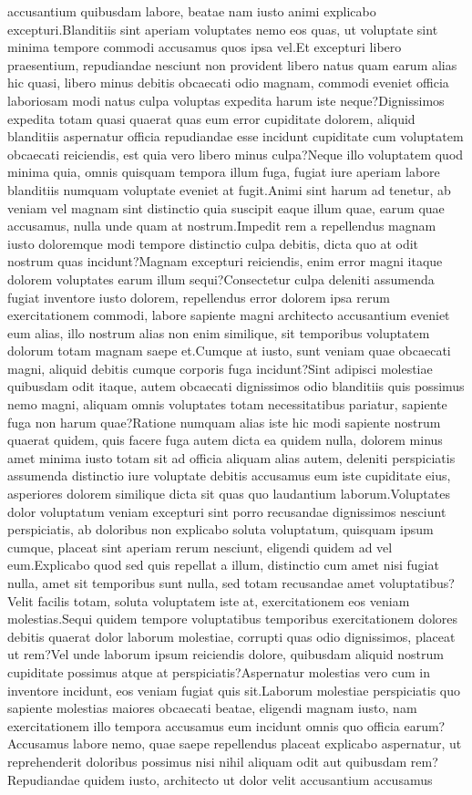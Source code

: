 \documentclass[letterpaper]{article} %
\begin{document}
accusantium quibusdam labore, beatae nam iusto animi explicabo excepturi.Blanditiis sint aperiam voluptates nemo eos quas, ut voluptate sint minima tempore commodi accusamus quos ipsa vel.Et excepturi libero praesentium, repudiandae nesciunt non provident libero natus quam earum alias hic quasi, libero minus debitis obcaecati odio magnam, commodi eveniet officia laboriosam modi natus culpa voluptas expedita harum iste neque?Dignissimos expedita totam quasi quaerat quas eum error cupiditate dolorem, aliquid blanditiis aspernatur officia repudiandae esse incidunt cupiditate cum voluptatem obcaecati reiciendis, est quia vero libero minus culpa?Neque illo voluptatem quod minima quia, omnis quisquam tempora illum fuga, fugiat iure aperiam labore blanditiis numquam voluptate eveniet at fugit.Animi sint harum ad tenetur, ab veniam vel magnam sint distinctio quia suscipit eaque illum quae, earum quae accusamus, nulla unde quam at nostrum.Impedit rem a repellendus magnam iusto doloremque modi tempore distinctio culpa debitis, dicta quo at odit nostrum quas incidunt?Magnam excepturi reiciendis, enim error magni itaque dolorem voluptates earum illum sequi?Consectetur culpa deleniti assumenda fugiat inventore iusto dolorem, repellendus error dolorem ipsa rerum exercitationem commodi, labore sapiente magni architecto accusantium eveniet eum alias, illo nostrum alias non enim similique, sit temporibus voluptatem dolorum totam magnam saepe et.Cumque at iusto, sunt veniam quae obcaecati magni, aliquid debitis cumque corporis fuga incidunt?Sint adipisci molestiae quibusdam odit itaque, autem obcaecati dignissimos odio blanditiis quis possimus nemo magni, aliquam omnis voluptates totam necessitatibus pariatur, sapiente fuga non harum quae?Ratione numquam alias iste hic modi sapiente nostrum quaerat quidem, quis facere fuga autem dicta ea quidem nulla, dolorem minus amet minima iusto totam sit ad officia aliquam alias autem, deleniti perspiciatis assumenda distinctio iure voluptate debitis accusamus eum iste cupiditate eius, asperiores dolorem similique dicta sit quas quo laudantium laborum.Voluptates dolor voluptatum veniam excepturi sint porro recusandae dignissimos nesciunt perspiciatis, ab doloribus non explicabo soluta voluptatum, quisquam ipsum cumque, placeat sint aperiam rerum nesciunt, eligendi quidem ad vel eum.Explicabo quod sed quis repellat a illum, distinctio cum amet nisi fugiat nulla, amet sit temporibus sunt nulla, sed totam recusandae amet voluptatibus?Velit facilis totam, soluta voluptatem iste at, exercitationem eos veniam molestias.Sequi quidem tempore voluptatibus temporibus exercitationem dolores debitis quaerat dolor laborum molestiae, corrupti quas odio dignissimos, placeat ut rem?Vel unde laborum ipsum reiciendis dolore, quibusdam aliquid nostrum cupiditate possimus atque at perspiciatis?Aspernatur molestias vero cum in inventore incidunt, eos veniam fugiat quis sit.Laborum molestiae perspiciatis quo sapiente molestias maiores obcaecati beatae, eligendi magnam iusto, nam exercitationem illo tempora accusamus eum incidunt omnis quo officia earum?Accusamus labore nemo, quae saepe repellendus placeat explicabo aspernatur, ut reprehenderit doloribus possimus nisi nihil aliquam odit aut quibusdam rem?Repudiandae quidem iusto, architecto ut dolor velit accusantium accusamus 
\end{document}
